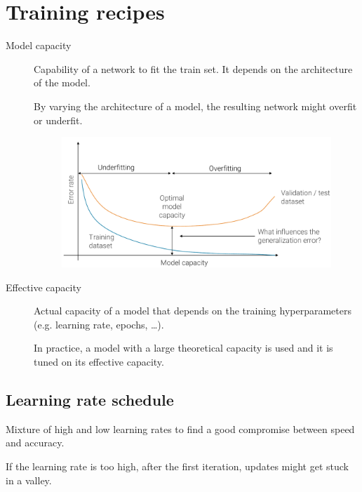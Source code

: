 \chapter{Training recipes}


\begin{description}
    \item[Model capacity] 
        Capability of a network to fit the train set.
        It depends on the architecture of the model.
    
        \begin{remark}
            By varying the architecture of a model, the resulting network might overfit or underfit.
        \end{remark}

        \begin{figure}[H]
            \centering
            \includegraphics[width=0.6\linewidth]{./img/_model_capacity.pdf}
        \end{figure}


    \item[Effective capacity] 
        Actual capacity of a model that depends on the training hyperparameters (e.g. learning rate, epochs, \dots).

        \begin{remark}
            In practice, a model with a large theoretical capacity is used and it is tuned on its effective capacity.
        \end{remark}
\end{description}



\section{Learning rate schedule}

Mixture of high and low learning rates to find a good compromise between speed and accuracy.

\begin{remark}
    If the learning rate is too high, after the first iteration, updates might get stuck in a valley.
\end{remark}

